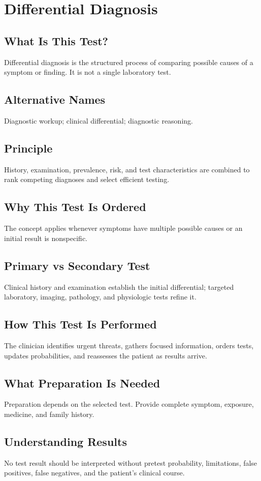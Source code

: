 \chapter{Differential Diagnosis}
\section*{What Is This Test?} Differential diagnosis is the structured process of comparing possible causes of a symptom or finding. It is not a single laboratory test.
\section*{Alternative Names} Diagnostic workup; clinical differential; diagnostic reasoning.
\section*{Principle} History, examination, prevalence, risk, and test characteristics are combined to rank competing diagnoses and select efficient testing.
\section*{Why This Test Is Ordered} The concept applies whenever symptoms have multiple possible causes or an initial result is nonspecific.
\section*{Primary vs Secondary Test} Clinical history and examination establish the initial differential; targeted laboratory, imaging, pathology, and physiologic tests refine it.
\section*{How This Test Is Performed} The clinician identifies urgent threats, gathers focused information, orders tests, updates probabilities, and reassesses the patient as results arrive.
\section*{What Preparation Is Needed} Preparation depends on the selected test. Provide complete symptom, exposure, medicine, and family history.
\section*{Understanding Results} No test result should be interpreted without pretest probability, limitations, false positives, false negatives, and the patient's clinical course.
